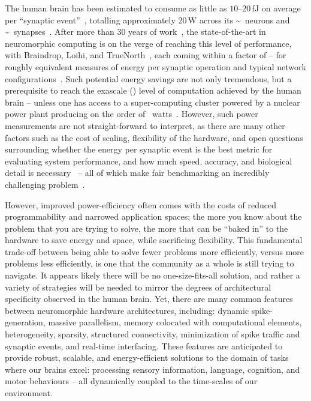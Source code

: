 The human brain has been estimated to consume as little as $10$--$20$\,fJ on average per ``synaptic event''~\citep{cassidy2014real, boahen2017neuromorph}, totalling approximately $20$\,W across its {\textasciitilde{}}~neurons and {\textasciitilde{}}~synapses~\citep{koch2014}.
After more than $30$ years of work~\citep{cassidy2013design}, the state-of-the-art in neuromorphic computing is on the verge of reaching this level of performance, with Braindrop, Loihi, and TrueNorth~\citep{merolla2014million}, each coming within a factor of -- for roughly equivalent measures of energy per synaptic operation and typical network configurations~\citep{braindrop2019}.
Such potential energy savings are not only tremendous, but a prerequisite to reach the exascale () level of computation achieved by the human brain -- unless one has access to a super-computing cluster powered by a nuclear power plant producing on the order of ~watts~\citep{furber2012build, neurogrid2014}.
However, such power measurements are not straight-forward to interpret, as there are many other factors such as the cost of scaling, flexibility of the hardware, and open questions surrounding whether the energy per synaptic event is the best metric for evaluating system performance, and how much speed, accuracy, and biological detail is necessary~\citep{eliasmith2013build} -- all of which make fair benchmarking an incredibly challenging problem~\citep{stewart2015closed}.

However, improved power-efficiency often comes with the costs of reduced programmability and narrowed application spaces;
the more you know about the problem that you are trying to solve, the more that can be ``baked in'' to the hardware to save energy and space, while sacrificing flexibility.
This fundamental trade-off between being able to solve fewer problems more efficiently, versus more problems less efficiently, is one that the community as a whole is still trying to navigate.
It appears likely there will be no one-size-fits-all solution, and rather a variety of strategies will be needed to mirror the degrees of architectural specificity observed in the human brain.
Yet, there are many common features between neuromorphic hardware architectures, including: dynamic spike-generation, massive parallelism, memory colocated with computational elements, heterogeneity, sparsity, structured connectivity, minimization of spike traffic and synaptic events, and real-time interfacing.
These features are anticipated to provide robust, scalable, and energy-efficient solutions to the domain of tasks where our brains excel: processing sensory information, language, cognition, and motor behaviours -- all dynamically coupled to the time-scales of our environment.


